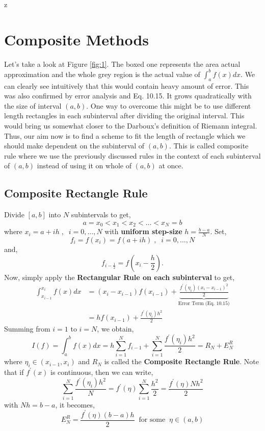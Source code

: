 z\documentclass[a4paper,12pt,twoside]{book}
\newcommand{\nll}[0]{\newline\newline}
\begin{document}
\section{Composite Methods}
Let's take a look at Figure \ref{fig:1}. The boxed one represents the area actual approximation and the whole grey region is the actual value of $\int_a^bf(x)dx$. We can clearly see intuitively that this would contain heavy amount of error. This was also confirmed by error analysis and Eq. 10.15. It grows quadratically with the size of interval $(a,b)$. 
\nll
One way to overcome this might be to use different length rectangles in each subinterval after dividing the original interval. This would bring us somewhat closer to the Darboux's definition of Riemann integral. Thus, our aim now is to find a scheme to fit the length of rectangle which we should make dependent on the subinterval of $(a,b)$. This is called composite rule where we use the previously discussed rules in the context of each subinterval of $(a,b)$ instead of using it on whole of $(a,b)$ at once.
\subsection{Composite Rectangle Rule}
Divide $[a,b]$ into $N$ subintervals to get,
\[a = x_0 < x_1 < x_2 < \dots < x_N = b\]
where $x_i = a+ih\;,\;\;i=0,\dots,N$ with \textbf{uniform step-size} $h = \frac{b-a}{N}$.
\nll
Set,
\[f_i = f(x_i) = f(a+ih)\;,\;\;i=0,\dots,N\]
and,
\[f_{i-\frac{1}{2}} = f(x_i - \frac{h}{2}).\]
Now, simply apply the \textbf{Rectangular Rule on each subinterval} to get,
\begin{equation*}
\begin{split}
    \int_{x_{i-1}}^{x_i}f(x)dx &= (x_i - x_{i-1})f(x_{i-1}) +  \underbrace{\frac{f^\prime(\eta_i)(x_i - x_{i-1})^2}{2}}_{\text{Error Term (Eq. 10.15)}}\\
    &= hf(x_{i-1}) + \frac{f^{\prime}(\eta_i)h^2}{2}
\end{split}
\end{equation*}
Summing from $i=1$ to $i=N$, we obtain,
\begin{equation}
   \boxed{ I(f) = \int_a^bf(x)dx = h\sum_{i=1}^N f_{i-1} + \sum_{i=1}^N \frac{f^\prime(\eta_i)h^2}{2} = R_N + E_N^R}
\end{equation}
where $\eta_i \in (x_{i-1},x_i)$ and $R_N$ is called the \textbf{Composite Rectangle Rule}.
\nll
Note that if $f^\prime(x)$ is continuous, then we can write,
\[\sum_{i=1}^N \frac{f^\prime(\eta_i)h^2}{N} = f^\prime(\eta) \sum_{i=1}^N \frac{h^2}{2} = \frac{f^\prime(\eta)Nh^2}{2} \]
with $Nh = b-a$, it becomes,
\begin{equation}
    E_N^R = \frac{f^\prime(\eta)(b-a)h}{2} \;\;\text{for some}\;\;\eta \in (a,b)
\end{equation}
\end{document}
